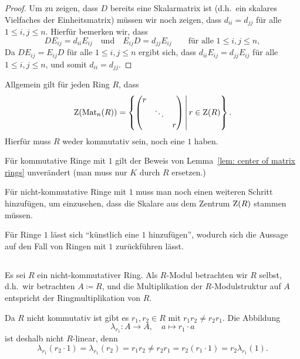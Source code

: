 \documentclass[a4paper, 10pt, numbers=noenddot]{scrartcl}
\begin{document}
\begin{proof}
  Um zu zeigen, dass $D$ bereits eine Skalarmatrix ist (d.h.\ ein skalares Vielfaches der Einheitsmatrix) müssen wir noch zeigen, dass $d_{ii} = d_{jj}$ für alle $1 \leq i,j \leq n$.
  Hierfür bemerken wir, dass
  \[
    D E_{ij} = d_{ii} E_{ij}
    \quad\text{und}\quad
    E_{ij} D = d_{jj} E_{ij}
    \qquad
    \text{für alle $1 \leq i,j \leq n$},
  \]
  Da $D E_{ij} = E_{ij} D$ für alle $1 \leq i,j \leq n$ ergibt sich, dass $d_{ii} E_{ij} = d_{jj} E_{ij}$ für alle $1 \leq i,j \leq n$, und somit $d_{ii} = d_{jj}$.
\end{proof}


\begin{remark}
  Allgemein gilt für jeden Ring $R$, dass
  \[
      \operatorname{Z}(\operatorname{Mat}_n(R))
    = \left\{
          \begin{pmatrix}
            r &         &   \\
              & \ddots  &   \\
              &         & r
          \end{pmatrix}
        \,
        \middle|
        \,
          r \in \operatorname{Z}(R)
      \right\}.
  \]
  Hierfür muss $R$ weder kommutativ sein, noch eine $1$ haben.
  
  Für kommutative Ringe mit $1$ gilt der Beweis von Lemma~\ref{lem: center of matrix rings} unverändert (man muss nur $K$ durch $R$ ersetzen.)
  
  Für nicht-kommutative Ringe mit $1$ muss man noch einen weiteren Schritt hinzufügen, um einzusehen, dass die Skalare aus dem Zentrum $\operatorname{Z}(R)$ stammen müssen.
  
  Für Ringe $1$ lässt sich ``künstlich eine $1$ hinzufügen'', wodurch sich die Aussage auf den Fall von Ringen mit $1$ zurückführen lässt.
\end{remark}





\subsection{}

Es sei $R$ ein nicht-kommutativer Ring.
Als $R$-Modul betrachten wir $R$ selbst, d.h.\ wir betrachten $A \coloneqq R$, und die Multiplikation der $R$-Modulstruktur auf $A$ entspricht der Ringmultiplikation von $R$.

Da $R$ nicht kommutativ ist gibt es $r_1, r_2 \in R$ mit $r_1 r_2 \neq r_2 r_1$.
Die Abbildung
\[
  \lambda_{r_1} \colon A \to A,
  \quad
  a \mapsto r_1 \cdot a
\]
ist deshalb nicht $R$-linear, denn
\[
        \lambda_{r_1}(r_2 \cdot 1)
  =     \lambda_{r_1}(r_2)
  =     r_1 r_2
  \neq  r_2 r_1
  =     r_2 (r_1 \cdot 1)
  =     r_2 \lambda_{r_1}(1).
\]
\end{document}
